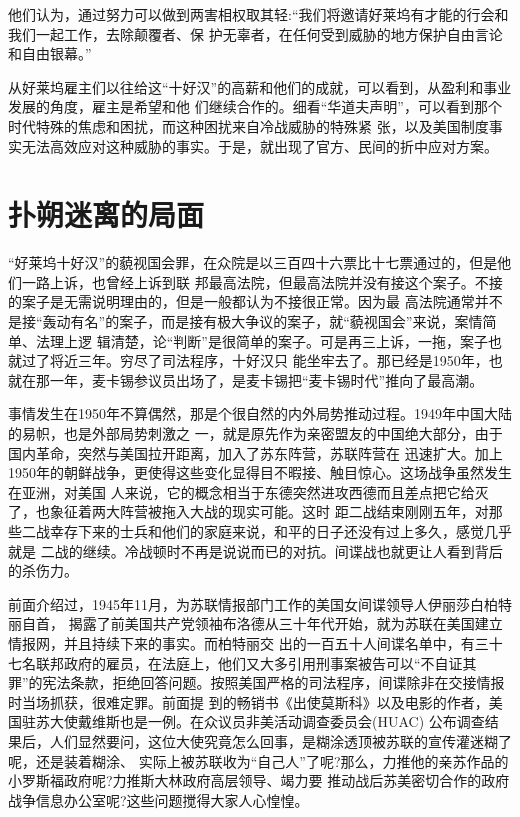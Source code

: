 \documentclass[10pt]{article}
\begin{document}
{他们认为，通过努力可以做到两害相权取其轻:``我们将邀请好莱坞有才能的行会和我们一起工作，去除颠覆者、保
护无辜者，在任何受到威胁的地方保护自由言论和自由银幕。''

从好莱坞雇主们以往给这``十好汉''的高薪和他们的成就，可以看到，从盈利和事业发展的角度，雇主是希望和他
们继续合作的。细看``华道夫声明''，可以看到那个时代特殊的焦虑和困扰，而这种困扰来自冷战威胁的特殊紧
张，以及美国制度事实无法高效应对这种威胁的事实。于是，就出现了官方、民间的折中应对方案。

\pagebreak
\section{扑朔迷离的局面}

``好莱坞十好汉''的藐视国会罪，在众院是以三百四十六票比十七票通过的，但是他们一路上诉，也曾经上诉到联
邦最高法院，但最高法院并没有接这个案子。不接的案子是无需说明理由的，但是一般都认为不接很正常。因为最
高法院通常并不是接``轰动有名''的案子，而是接有极大争议的案子，就``藐视国会''来说，案情简单、法理上逻
辑清楚，论``判断''是很简单的案子。可是再三上诉，一拖，案子也就过了将近三年。穷尽了司法程序，十好汉只
能坐牢去了。那已经是1950年，也就在那一年，麦卡锡参议员出场了，是麦卡锡把``麦卡锡时代''推向了最高潮。

事情发生在1950年不算偶然，那是个很自然的内外局势推动过程。1949年中国大陆的易帜，也是外部局势刺激之
一，就是原先作为亲密盟友的中国绝大部分，由于国内革命，突然与美国拉开距离，加入了苏东阵营，苏联阵营在
迅速扩大。加上1950年的朝鲜战争，更使得这些变化显得目不暇接、触目惊心。这场战争虽然发生在亚洲，对美国
人来说，它的概念相当于东德突然进攻西德而且差点把它给灭了，也象征着两大阵营被拖入大战的现实可能。这时
距二战结束刚刚五年，对那些二战幸存下来的士兵和他们的家庭来说，和平的日子还没有过上多久，感觉几乎就是
二战的继续。冷战顿时不再是说说而已的对抗。间谍战也就更让人看到背后的杀伤力。

前面介绍过，1945年11月，为苏联情报部门工作的美国女间谍领导人伊丽莎白\textperiodcentered 柏特丽自首，
揭露了前美国共产党领袖布洛德从三十年代开始，就为苏联在美国建立情报网，并且持续下来的事实。而柏特丽交
出的一百五十人间谍名单中，有三十七名联邦政府的雇员，在法庭上，他们又大多引用刑事案被告可以``不自证其
罪''的宪法条款，拒绝回答问题。按照美国严格的司法程序，间谍除非在交接情报时当场抓获，很难定罪。前面提
到的畅销书《出使莫斯科》以及电影的作者，美国驻苏大使戴维斯也是一例。在众议员非美活动调查委员会(HUAC)
公布调查结果后，人们显然要问，这位大使究竟怎么回事，是糊涂透顶被苏联的宣传灌迷糊了呢，还是装着糊涂、
实际上被苏联收为``自己人''了呢?那么，力推他的亲苏作品的小罗斯福政府呢?力推斯大林政府高层领导、竭力要
推动战后苏美密切合作的政府战争信息办公室呢?这些问题搅得大家人心惶惶。

}
\end{document}
